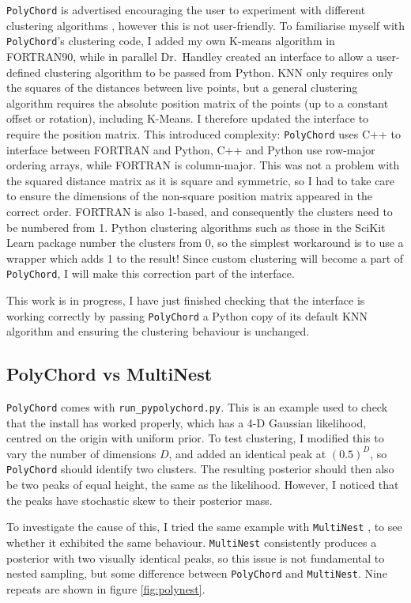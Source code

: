 \documentclass{article}
\begin{document}
\texttt{PolyChord} is advertised encouraging the user to experiment with different clustering algorithms \cite{PolyChord_1, PolyChord_2}, however this is not user-friendly. To familiarise myself with \texttt{PolyChord}'s clustering code, I added my own K-means algorithm in FORTRAN90, while in parallel Dr.~Handley created an interface to allow a user-defined clustering algorithm to be passed from Python. KNN only requires only the squares of the distances between live points, but a general clustering algorithm requires the absolute position matrix of the points (up to a constant offset or rotation), including K-Means. I therefore updated the interface to require the position matrix. This introduced complexity: \texttt{PolyChord} uses C++ to interface between FORTRAN and Python, C++ and Python use row-major ordering arrays, while FORTRAN is column-major. This was not a problem with the squared distance matrix as it is square and symmetric, so I had to take care to ensure the dimensions of the non-square position matrix appeared in the correct order. FORTRAN is also 1-based, and consequently the clusters need to be numbered from 1. Python clustering algorithms such as those in the SciKit Learn package number the clusters from 0, so the simplest workaround is to use a wrapper which adds 1 to the result! Since custom clustering will become a part of \texttt{PolyChord}, I will make this correction part of the interface.

This work is in progress, I have just finished checking that the interface is working correctly by passing \texttt{PolyChord} a Python copy of its default KNN algorithm and ensuring the clustering behaviour is unchanged. 

\subsection{PolyChord vs MultiNest}
 
\texttt{PolyChord} comes with \texttt{run\_pypolychord.py}. This is an example used to check that the install has worked properly, which has a 4-D Gaussian likelihood, centred on the origin with uniform prior. To test clustering, I modified this to vary the number of dimensions $D$, and added an identical peak at $(0.5)^D$, so \texttt{PolyChord} should identify two clusters. The resulting posterior should then also be two peaks of equal height, the same as the likelihood. However, I noticed that the peaks have stochastic skew to their posterior mass.

To investigate the cause of this, I tried the same example with \texttt{MultiNest} \cite{MultiNest}, to see whether it exhibited the same behaviour. \texttt{MultiNest} consistently produces a posterior with two visually identical peaks, so this issue is not fundamental to nested sampling, but some difference between \texttt{PolyChord} and \texttt{MultiNest}. Nine repeats are shown in figure \ref{fig:polynest}.
\end{document}
